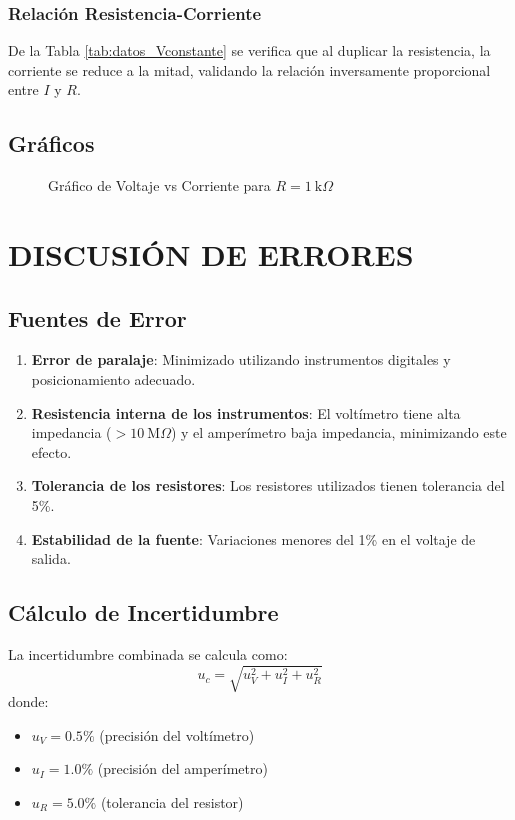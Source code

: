 \documentclass[12pt]{article}
\begin{document}
\subsubsection{Relación Resistencia-Corriente}
De la Tabla \ref{tab:datos_Vconstante} se verifica que al duplicar la resistencia, la corriente se reduce a la mitad, validando la relación inversamente proporcional entre $I$ y $R$.

\subsection{Gráficos}

\begin{figure}[h]
    \centering
    \caption{Gráfico de Voltaje vs Corriente para $R = 1\ \text{k}\Omega$}
    \label{fig:grafico_VvsI}
\end{figure}

\section{DISCUSIÓN DE ERRORES}
\label{sec:errores}

\subsection{Fuentes de Error}
\begin{enumerate}
    \item \textbf{Error de paralaje}: Minimizado utilizando instrumentos digitales y posicionamiento adecuado.
    \item \textbf{Resistencia interna de los instrumentos}: El voltímetro tiene alta impedancia ($>10\ \text{M}\Omega$) y el amperímetro baja impedancia, minimizando este efecto.
    \item \textbf{Tolerancia de los resistores}: Los resistores utilizados tienen tolerancia del 5\%.
    \item \textbf{Estabilidad de la fuente}: Variaciones menores del 1\% en el voltaje de salida.
\end{enumerate}

\subsection{Cálculo de Incertidumbre}
La incertidumbre combinada se calcula como:
\[
u_c = \sqrt{u_V^2 + u_I^2 + u_R^2}
\]
donde:
\begin{itemize}
    \item $u_V = 0.5\%$ (precisión del voltímetro)
    \item $u_I = 1.0\%$ (precisión del amperímetro)
    \item $u_R = 5.0\%$ (tolerancia del resistor)
\end{itemize}
\end{document}
